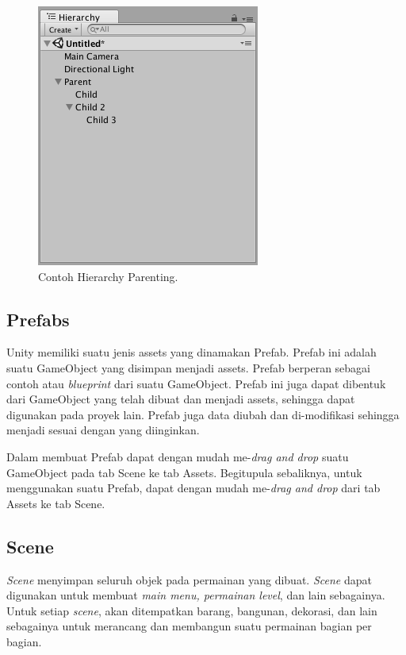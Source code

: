  
\begin{figure}[htbp]
\centering
\includegraphics[scale=0.7]{Gambar/hierarchy-parenting.png}
\caption{Contoh Hierarchy Parenting.} 
\label{fig:contoh-hierarchy-parenting}
\end{figure}

\subsection{Prefabs}
\label{ssec:Prefabs}

Unity memiliki suatu jenis assets yang dinamakan Prefab. Prefab ini adalah suatu GameObject yang disimpan menjadi assets. Prefab berperan sebagai contoh atau \textit{blueprint} dari suatu GameObject. Prefab ini juga dapat dibentuk dari GameObject yang telah dibuat dan menjadi assets, sehingga dapat digunakan pada proyek lain. Prefab juga data diubah dan di-modifikasi sehingga menjadi sesuai dengan yang diinginkan. 

Dalam membuat Prefab dapat dengan mudah me-\textit{drag and drop} suatu GameObject pada tab Scene ke tab Assets. Begitupula sebaliknya, untuk menggunakan suatu Prefab, dapat dengan mudah me-\textit{drag and drop} dari tab Assets ke tab Scene. 

\subsection{Scene}
\label{ssec:scene}

\textit{Scene} menyimpan seluruh objek pada permainan yang dibuat. \textit{Scene} dapat digunakan untuk membuat \textit{main menu, permainan level}, dan lain sebagainya. Untuk setiap \textit{scene}, akan ditempatkan barang, bangunan, dekorasi, dan lain sebagainya untuk merancang dan membangun suatu permainan bagian per bagian.  

